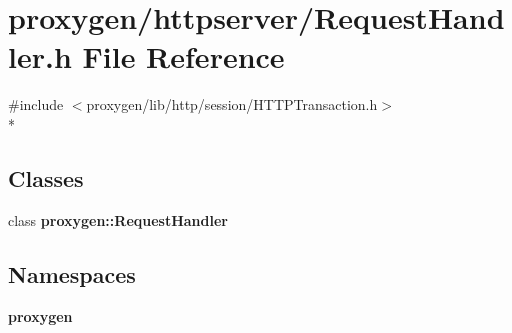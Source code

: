 \section{proxygen/httpserver/\+Request\+Handler.h File Reference}
\label{RequestHandler_8h}
{\ttfamily \#include $<$proxygen/lib/http/session/\+H\+T\+T\+P\+Transaction.\+h$>$}\\*
\subsection*{Classes}
\begin{DoxyCompactItemize}
\item 
class {\bf proxygen\+::\+Request\+Handler}
\end{DoxyCompactItemize}
\subsection*{Namespaces}
\begin{DoxyCompactItemize}
\item 
 {\bf proxygen}
\end{DoxyCompactItemize}
